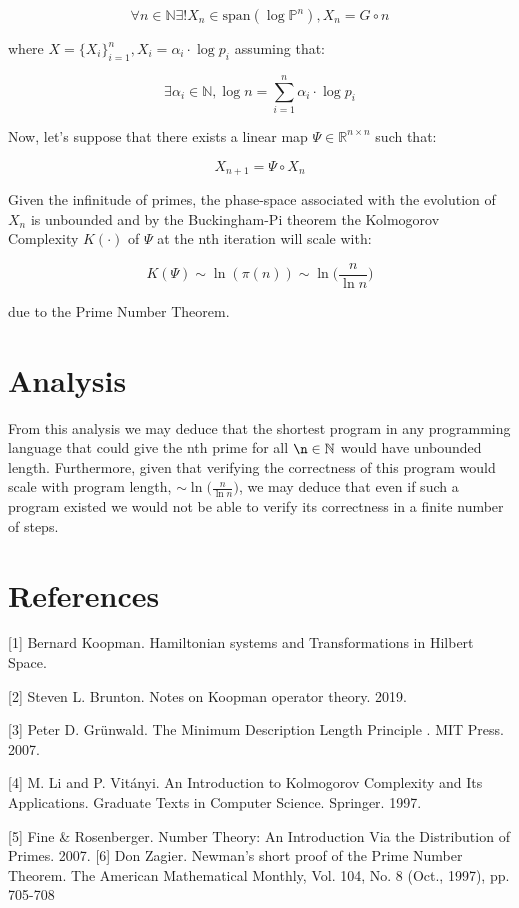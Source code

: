\documentclass{article}
\begin{document}
\begin{equation}
\forall n \in \mathbb{N} \exists! X_n \in \text{span}(\log \mathbb{P}^n), X_n = G \circ n
\end{equation}

where $X = \{X_i\}_{i=1}^n, X_i = \alpha_i \cdot \log p_i$ assuming that:

\begin{equation}
\exists \alpha_i \in \mathbb{N}, \log n = \sum_{i=1}^n \alpha_i \cdot \log p_i
\end{equation}

Now, let's suppose that there exists a linear map $\Psi \in \mathbb{R}^{n \times n}$ such that:

\begin{equation}
X_{n+1} = \Psi \circ X_n
\end{equation}

Given the infinitude of primes, the phase-space associated with the evolution of $X_n$ is unbounded and by the Buckingham-Pi
theorem the Kolmogorov Complexity $K(\cdot)$ of $\Psi$ at the nth iteration will scale with:

\begin{equation}
K(\Psi) \sim \ln(\pi(n)) \sim \ln \big(\frac{n}{\ln n}\big)
\end{equation}

due to the Prime Number Theorem.

\newpage

\section{Analysis}

From this analysis we may deduce that the shortest program in any programming language that could give the nth prime for all $\n \in \mathbb{N}$ would have unbounded length. Furthermore, given that verifying the correctness of this program would scale with program length, $ \sim \ln \big(\frac{n}{\ln n}\big)$, we may deduce that even if such a program existed we would not be able to verify its correctness in a finite number of steps.

\section*{References}

\small

[1] Bernard Koopman. Hamiltonian systems and Transformations in Hilbert Space.

[2] Steven L. Brunton. Notes on Koopman operator theory. 2019.

[3] Peter D. Grünwald. The Minimum Description Length Principle
. MIT Press. 2007.

[4] M. Li and P. Vitányi. An Introduction to Kolmogorov Complexity and Its Applications. Graduate Texts in Computer Science. Springer. 1997.

[5] Fine & Rosenberger. Number Theory: An Introduction Via the Distribution of Primes. 2007.
[6] Don Zagier. Newman’s short proof of the Prime Number Theorem. The American Mathematical Monthly, Vol. 104, No. 8 (Oct., 1997), pp. 705-708
\end{document}
